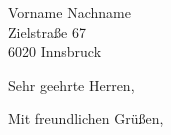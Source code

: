 \documentclass[
fontsize=11pt,
paper=a4,
headsepline,
footsepline,
parskip=false
]{scrlttr2}
\begin{document}
\begin{letter}{%
Vorname Nachname\\ 
Zielstraße 67\\ 
6020 Innsbruck
}

\opening{Sehr geehrte Herren,}





\closing{Mit freundlichen Grüßen,}






  
\end{letter}
\end{document}
